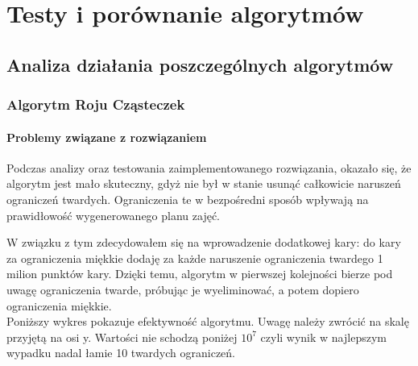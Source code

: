 \chapter{Testy i porównanie algorytmów}
\section{Analiza działania poszczególnych algorytmów}
\subsection{Algorytm Roju Cząsteczek}
\subsubsection{Problemy związane z rozwiązaniem}
\par Podczas analizy oraz testowania zaimplementowanego rozwiązania, okazało się, że algorytm jest mało skuteczny, gdyż nie był w stanie usunąć całkowicie naruszeń ograniczeń twardych. Ograniczenia te w bezpośredni sposób wpływają na prawidłowość wygenerowanego planu zajęć.
\par W związku z tym zdecydowałem się na wprowadzenie dodatkowej kary: do kary za ograniczenia miękkie dodaję za każde naruszenie ograniczenia twardego 1 milion punktów kary. Dzięki temu, algorytm w pierwszej kolejności bierze pod uwagę ograniczenia twarde, próbując je wyeliminować, a potem dopiero ograniczenia miękkie. \\

Poniższy wykres pokazuje efektywność algorytmu. Uwagę należy zwrócić na skalę przyjętą na osi y. Wartości nie schodzą poniżej $10^{7}$ czyli wynik w najlepszym wypadku nadal łamie 10 twardych ograniczeń.

